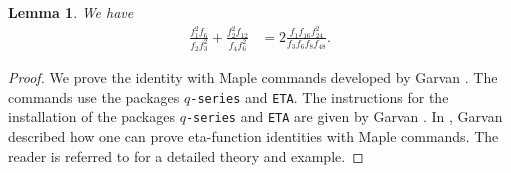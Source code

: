 \documentclass[12pt]{article}
\numberwithin{equation}{section}
\theoremstyle{plain}
\numberwithin{theorem}{section}
\newtheorem{lemma}[theorem]{Lemma}
\theoremstyle{definition}
\theoremstyle{remark}
\begin{document}
\fi
\begin{lemma}\label{Lemma for mod 8}
We have
\begin{align*}
    \frac{f_1^2 f_6}{f_2 f_3^2}+\frac{f_2^2 f_{12}}{f_4 f_6^2}&=2 \frac{f_1 f_{16} f_{24}^2}{f_3 f_6 f_8 f_{48}}.
\end{align*}
\end{lemma}
\begin{proof}
We prove the identity with Maple commands developed by Garvan \cite{Gar19}. The commands use the packages \texttt{$q$-series} and \texttt{ETA}. The instructions for the installation of the packages \texttt{$q$-series} and \texttt{ETA} are given by Garvan \cite{Gar99}. In \cite[Secion 3]{Gar19}, Garvan described how one can prove eta-function identities with Maple commands. The reader is referred to  \cite[Secion 3]{Gar19} for a detailed theory and example. 


\end{proof}
\end{document}
